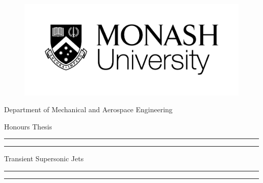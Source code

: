  

\begin{titlepage} %

	\centering %
	
	\scshape %
	
	
	\begin{figure}[H] 
	 \centering
	 \includegraphics[scale=0.4]{monash_logo.jpg} 
    \end{figure}
    Department of Mechanical and Aerospace Engineering
    
    \vspace{2\baselineskip}
    
	{\Large Honours Thesis}
	

	\vspace*{3\baselineskip} %
	
	\rule{\textwidth}{1.6pt}\vspace*{-\baselineskip}\vspace*{2pt} %
	\rule{\textwidth}{0.4pt} %
	
	\vspace{1.5\baselineskip} %
	
	{\LARGE Transient Supersonic Jets} %
	
	\vspace{1.5\baselineskip} %
	
	\rule{\textwidth}{0.4pt}\vspace*{-\baselineskip}\vspace{3.2pt} %
	\rule{\textwidth}{1.6pt} %
	


\end{titlepage}

